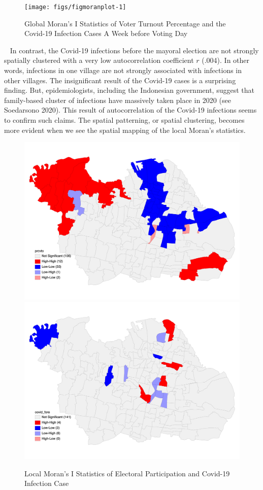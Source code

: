 \documentclass[
  12pt,
]{article}
\begin{document}
\normalsize\normalsize

\normalsize

\begin{figure}
\texttt{[image: figs/figmoranplot-1]} \caption{Global Moran's I Statistics of Voter Turnout Percentage and the Covid-19 Infection Cases A Week before Voting Day}\label{fig:moranplot}
\end{figure}
\normalsize

~ In contrast, the Covid-19 infections before the mayoral election are
not strongly spatially clustered with a very low autocorrelation
coefficient \(r\) (.004). In other words, infections in one village are
not strongly associated with infections in other villages. The
insignificant result of the Covid-19 cases is a surprising finding. But,
epidemiologists, including the Indonesian government, suggest that
family-based cluster of infections have massively taken place in 2020
(see Soedarsono 2020). This result of autocorrelation of the Covid-19
infections seems to confirm such claims. The spatial patterning, or
spatial clustering, becomes more evident when we see the spatial mapping
of the local Moran's statistics.

\normalsize

\begin{figure}
\includegraphics[width=0.49\linewidth]{LocalMoran-VTO} \includegraphics[width=0.49\linewidth]{LocalMoran-CovidBefore} \caption{Local Moran's I Statistics of Electoral Participation and Covid-19 Infection Case}\label{fig:vto}
\end{figure}
\normalsize
\end{document}
